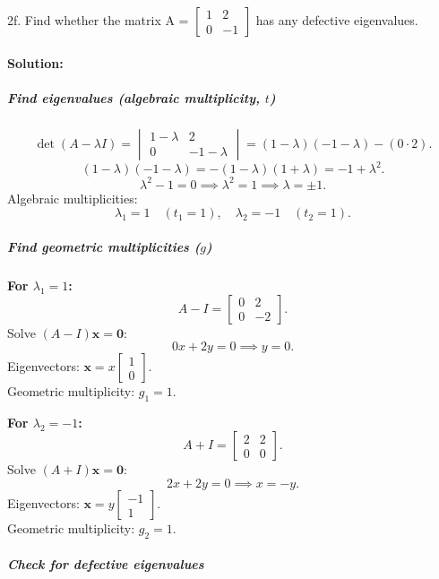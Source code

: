 \documentclass[12pt,letterpaper]{article}
\begin{document}
    \newpage

    2f. Find whether the matrix A = \(
        \begin{bmatrix}
            1 & 2 \\
            0 & -1 
        \end{bmatrix}
    \) has any defective eigenvalues. 

 
\paragraph{Solution:}

\subparagraph{Find eigenvalues (algebraic multiplicity, \( t \))}
\[
\det(A - \lambda I) = \begin{vmatrix}
1 - \lambda & 2 \\
0 & -1 - \lambda
\end{vmatrix} = (1 - \lambda)(-1 - \lambda) - (0 \cdot 2).
\]
\[
(1 - \lambda)(-1 - \lambda) = -(1 - \lambda)(1 + \lambda) = -1 + \lambda^2.
\]
\[
\lambda^2 - 1 = 0 \implies \lambda^2 = 1 \implies \lambda = \pm 1.
\]
Algebraic multiplicities:
\[
\lambda_1 = 1 \quad (t_1 = 1), \quad \lambda_2 = -1 \quad (t_2 = 1).
\]

\subparagraph{Find geometric multiplicities (\( g \))}

\textbf{For \( \lambda_1 = 1 \):}
\[
A - I = \begin{bmatrix}
0 & 2 \\
0 & -2
\end{bmatrix}.
\]
Solve \( (A - I)\mathbf{x} = \mathbf{0} \):
\[
0x + 2y = 0 \implies y = 0.
\]
Eigenvectors: \( \mathbf{x} = x \begin{bmatrix} 1 \\ 0 \end{bmatrix} \). \\
Geometric multiplicity: \( g_1 = 1 \).

\textbf{For \( \lambda_2 = -1 \):}
\[
A + I = \begin{bmatrix}
2 & 2 \\
0 & 0
\end{bmatrix}.
\]
Solve \( (A + I)\mathbf{x} = \mathbf{0} \):
\[
2x + 2y = 0 \implies x = -y.
\]
Eigenvectors: \( \mathbf{x} = y \begin{bmatrix} -1 \\ 1 \end{bmatrix} \). \\
Geometric multiplicity: \( g_2 = 1 \).

\subparagraph{Check for defective eigenvalues} 
\end{document}
